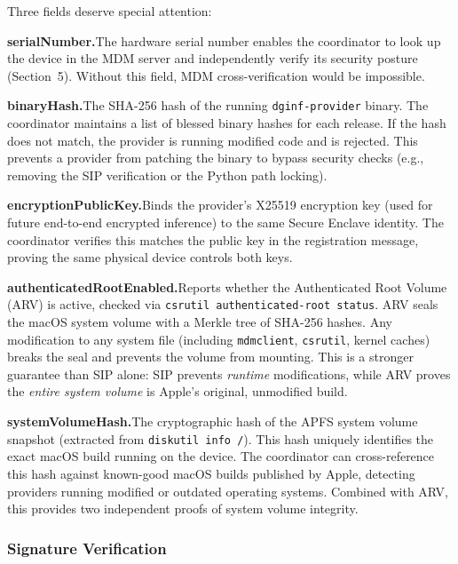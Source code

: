 \documentclass[10pt,twocolumn,letterpaper]{article}
\begin{document}
Three fields deserve special attention:

\textbf{serialNumber.}\quad The hardware serial number enables the coordinator to look up the device in the MDM server and independently verify its security posture (Section~5). Without this field, MDM cross-verification would be impossible.

\textbf{binaryHash.}\quad The SHA-256 hash of the running \texttt{dginf-provider} binary. The coordinator maintains a list of blessed binary hashes for each release. If the hash does not match, the provider is running modified code and is rejected. This prevents a provider from patching the binary to bypass security checks (e.g., removing the SIP verification or the Python path locking).

\textbf{encryptionPublicKey.}\quad Binds the provider's X25519 encryption key (used for future end-to-end encrypted inference) to the same Secure Enclave identity. The coordinator verifies this matches the public key in the registration message, proving the same physical device controls both keys.

\textbf{authenticatedRootEnabled.}\quad Reports whether the Authenticated Root Volume (ARV) is active, checked via \texttt{csrutil authenticated-root status}. ARV seals the macOS system volume with a Merkle tree of SHA-256 hashes. Any modification to any system file (including \texttt{mdmclient}, \texttt{csrutil}, kernel caches) breaks the seal and prevents the volume from mounting. This is a stronger guarantee than SIP alone: SIP prevents \emph{runtime} modifications, while ARV proves the \emph{entire system volume} is Apple's original, unmodified build.

\textbf{systemVolumeHash.}\quad The cryptographic hash of the APFS system volume snapshot (extracted from \texttt{diskutil info /}). This hash uniquely identifies the exact macOS build running on the device. The coordinator can cross-reference this hash against known-good macOS builds published by Apple, detecting providers running modified or outdated operating systems. Combined with ARV, this provides two independent proofs of system volume integrity.

\subsubsection{Signature Verification}
\end{document}

